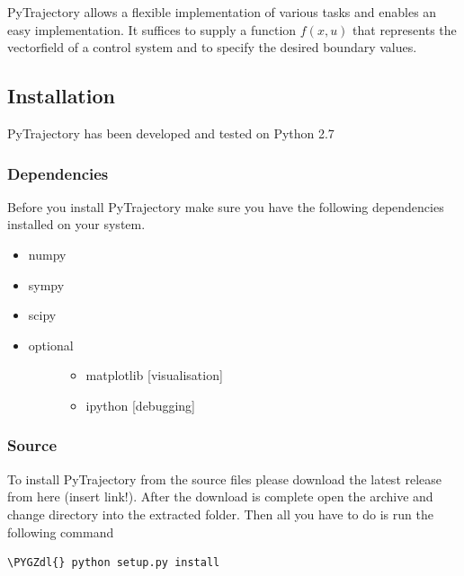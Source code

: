 \documentclass[letterpaper,10pt,english]{sphinxmanual}
\def\PYGZdl{\char`\$}
\begin{document}
PyTrajectory allows a flexible implementation of various tasks and enables an easy
implementation. It suffices to supply a function \(f(x,u)\) that represents the
vectorfield of a control system and to specify the desired boundary values.


\subsection{Installation}
\label{guide/start:installation}
PyTrajectory has been developed and tested on Python 2.7


\subsubsection{Dependencies}
\label{guide/start:dependencies}
Before you install PyTrajectory make sure you have the following
dependencies installed on your system.
\begin{itemize}
\item {} 
numpy

\item {} 
sympy

\item {} 
scipy

\item {} \begin{description}
\item[{optional}] \leavevmode\begin{itemize}
\item {} 
matplotlib {[}visualisation{]}

\item {} 
ipython {[}debugging{]}

\end{itemize}

\end{description}

\end{itemize}


\subsubsection{Source}
\label{guide/start:source}
To install PyTrajectory from the source files please download the latest release from
here (insert link!). After the download is complete open the archive and change directory
into the extracted folder. Then all you have to do is run the following command

\begin{Verbatim}[commandchars=\\\{\}]
\PYGZdl{} python setup.py install
\end{Verbatim}
\end{document}
